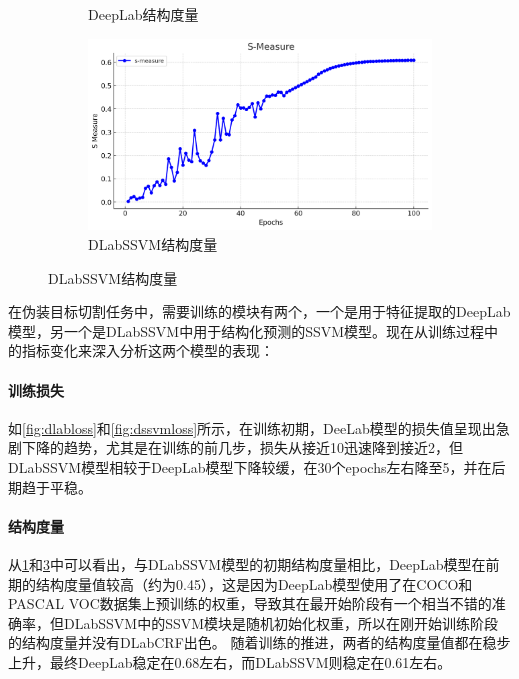 \documentclass[a4paper,12pt]{ctexart}
\begin{document}
\begin{figure}[h!]
\begin{subfigure}{0.4\textwidth}
        \caption{DeepLab结构度量}
        \label{fig:dlabsm}
    \end{subfigure}%
    \hspace{0.1\textwidth}
    \begin{subfigure}{0.4\textwidth}
        \centering
        \includegraphics[width=\linewidth]{figures/ssvm_smeasure.png}
        \caption{DLabSSVM结构度量}
        \label{fig:dssvmsm}
    \end{subfigure}%
\end{figure}

在伪装目标切割任务中，需要训练的模块有两个，一个是用于特征提取的DeepLab模型，另一个是DLabSSVM中用于结构化预测的SSVM模型。现在从训练过程中的指标变化来深入分析这两个模型的表现：

\paragraph{训练损失}如\ref{fig:dlabloss}和\ref{fig:dssvmloss}所示，在训练初期，DeeLab模型的损失值呈现出急剧下降的趋势，尤其是在训练的前几步，损失从接近10迅速降到接近2，但DLabSSVM模型相较于DeepLab模型下降较缓，在30个epochs左右降至5，并在后期趋于平稳。

\paragraph{结构度量}从\ref{fig:dlabsm}和\ref{fig:dssvmsm}中可以看出，与DLabSSVM模型的初期结构度量相比，DeepLab模型在前期的结构度量值较高（约为0.45），这是因为DeepLab模型使用了在COCO和PASCAL VOC数据集上预训练的权重，导致其在最开始阶段有一个相当不错的准确率，但DLabSSVM中的SSVM模块是随机初始化权重，所以在刚开始训练阶段的结构度量并没有DLabCRF出色。
随着训练的推进，两者的结构度量值都在稳步上升，最终DeepLab稳定在0.68左右，而DLabSSVM则稳定在0.61左右。
\end{document}

